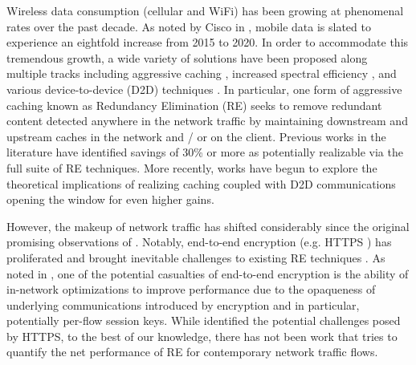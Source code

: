 \documentclass{sig-alternate}
\begin{document}
Wireless data consumption (cellular and WiFi) has been growing at phenomenal rates over the past decade. As noted by Cisco in \cite{VNI:2016}, mobile data is slated to experience an eightfold increase from 2015 to 2020. In order to accommodate this tremendous growth, a wide variety of solutions have been proposed along multiple tracks including aggressive caching \cite{Anand:2009,Qian:2013}, increased spectral efficiency \cite{3GPP:Release10}, and various device-to-device (D2D) techniques \cite{Asadi:D2D,Ji:D2D}.  In particular, one form of aggressive caching known as Redundancy Elimination (RE) \cite{Spring:2000,SmartRE:2009} seeks to remove redundant content detected anywhere in the network traffic by maintaining downstream and upstream caches in the network and / or on the client. Previous works in the literature have identified savings of 30\% or more \cite{Qian:2013,Finamore:2013} as potentially realizable via the full suite of RE techniques. More recently, works have begun to explore the theoretical implications of realizing caching coupled with D2D communications \cite{Ji:D2D} opening the window for even higher gains.         

However, the makeup of network traffic has shifted considerably since the original promising observations of \cite{Qian:2013,Finamore:2013}. Notably, end-to-end encryption (e.g. HTTPS \cite{RFC2818}) has proliferated and brought inevitable challenges to existing RE techniques \cite{Naylor:2014}. As noted in \cite{Naylor:2014}, one of the potential casualties of end-to-end encryption is the ability of in-network optimizations to improve performance due to the opaqueness of underlying communications introduced by encryption and in particular, potentially per-flow session keys. While \cite{Naylor:2014} identified the potential challenges posed by HTTPS, to the best of our knowledge, there has not been work that tries to quantify the net performance of RE for contemporary network traffic flows. 
\end{document}
